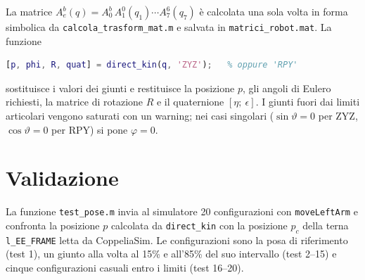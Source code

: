 La matrice $A_e^b(q) = A_0^b\, A_1^0(q_1) \cdots A_7^6(q_7)$ \`e calcolata una sola volta in forma simbolica da \texttt{calcola\_trasform\_mat.m} e salvata in \texttt{matrici\_robot.mat}.
La funzione
\begin{lstlisting}[language=Matlab]
[p, phi, R, quat] = direct_kin(q, 'ZYZ');   % oppure 'RPY'
\end{lstlisting}
sostituisce i valori dei giunti e restituisce la posizione $p$, gli angoli di Eulero richiesti, la matrice di rotazione $R$ e il quaternione $[\eta;\ \epsilon]$.
I giunti fuori dai limiti articolari vengono saturati con un warning; nei casi singolari ($\sin\vartheta = 0$ per ZYZ, $\cos\vartheta = 0$ per RPY) si pone $\varphi = 0$.

\section{Validazione}
\label{sec:hw1-validazione}

La funzione \texttt{test\_pose.m} invia al simulatore 20 configurazioni con \texttt{moveLeftArm} e confronta la posizione $p$ calcolata da \texttt{direct\_kin} con la posizione $p_c$ della terna \texttt{l\_EE\_FRAME} letta da CoppeliaSim.
Le configurazioni sono la posa di riferimento (test 1), un giunto alla volta al 15\% e all'85\% del suo intervallo (test 2--15) e cinque configurazioni casuali entro i limiti (test 16--20).

